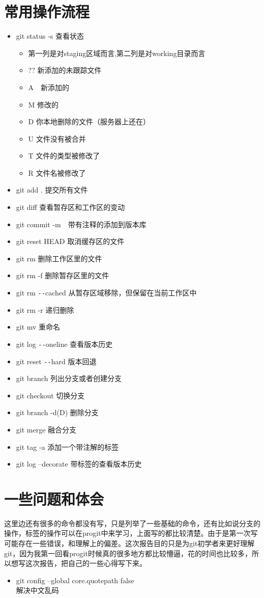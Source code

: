 \documentclass[12pt,a4paper]{article}
\begin{document}
\section{常用操作流程}
\begin{itemize}
\item git status -s  查看状态
	\begin{itemize}
	\item 第一列是对staging区域而言,第二列是对working目录而言
    \item ?? 新添加的未跟踪文件	
	\item A　新添加的
	\item M 修改的
	\item D 你本地删除的文件（服务器上还在）
	\item U 文件没有被合并
	\item T 文件的类型被修改了	
	\item R 文件名被修改了
	\end{itemize}
\item git add . 提交所有文件
\item git diff 查看暂存区和工作区的变动
\item git commit -m　带有注释的添加到版本库
\item git reset HEAD 取消缓存区的文件
\item git rm 删除工作区里的文件
\item git rm -f 删除暂存区里的文件
\item git rm \verb|--|cached 从暂存区域移除，但保留在当前工作区中
\item git rm -r 递归删除
\item git mv 重命名
\\
\item git log \verb|--|oneline 查看版本历史
\item git reset \verb|--|hard 版本回退
\\
\item git branch 列出分支或者创建分支
\item git checkout 切换分支
\item git branch -d(D) 删除分支
\item git merge 融合分支
\\
\item git tag -a 添加一个带注解的标签
\item git log --decorate 带标签的查看版本历史
\end{itemize}
\section{一些问题和体会}\setlength{\parindent}{2em}
这里边还有很多的命令都没有写，只是列举了一些基础的命令，还有比如说分支的操作，标签的操作可以在progit中来学习，上面写的都比较清楚。由于是第一次写可能存在一些错误，和理解上的偏差。这次报告目的只是为git初学者来更好理解git，因为我第一回看progit时候真的很多地方都比较懵逼，花的时间也比较多，所以想写这次报告，把自己的一些心得写下来。

\begin{itemize}
\item git config --global core.quotepath false\\解决中文乱码
\end{itemize}
\end{document}
